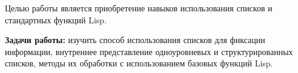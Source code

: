 \Introduction

Целью работы является приобретение навыков использования списков и стандартных функций Lisp.


\textbf{Задачи работы:} изучить способ использования списков для фиксации информации, внутреннее представление одноуровневых и структурированных списков, методы их обработки с использованием базовых функций Lisp.

